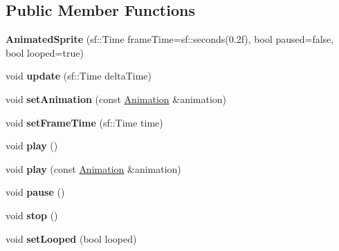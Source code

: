 \subsection*{Public Member Functions}
\begin{DoxyCompactItemize}
\item 
\mbox{\label{class_animated_sprite_a097ab8444824e7085d71a1f7144e7763}} 
{\bfseries Animated\+Sprite} (sf\+::\+Time frame\+Time=sf\+::seconds(0.\+2f), bool paused=false, bool looped=true)
\item 
\mbox{\label{class_animated_sprite_a17a41ff812631a9d8947d272933d6696}} 
void {\bfseries update} (sf\+::\+Time delta\+Time)
\item 
\mbox{\label{class_animated_sprite_ab1afc57d90d57a0c4bc4f5b090f2dacf}} 
void {\bfseries set\+Animation} (const \hyperlink{class_animation}{Animation} \&animation)
\item 
\mbox{\label{class_animated_sprite_af598fab5c3599ccc5ed1e2d4fefa68cc}} 
void {\bfseries set\+Frame\+Time} (sf\+::\+Time time)
\item 
\mbox{\label{class_animated_sprite_a203b968f1cb374cca5dbc89716174020}} 
void {\bfseries play} ()
\item 
\mbox{\label{class_animated_sprite_a9ea345649a4e012d096bc04aafe1ecb0}} 
void {\bfseries play} (const \hyperlink{class_animation}{Animation} \&animation)
\item 
\mbox{\label{class_animated_sprite_a48384db59427423b5c1d98f6ee94fe45}} 
void {\bfseries pause} ()
\item 
\mbox{\label{class_animated_sprite_af9734f4346d3d2370322b2dcaeef133c}} 
void {\bfseries stop} ()
\item 
\mbox{\label{class_animated_sprite_a855a5a48ea2e1c51c7c9304857dd2f8c}} 
void {\bfseries set\+Looped} (bool looped)
\item 
\mbox{\label{class_animated_sprite_a1a96a0f6570efddd2eb26f89bc5b6f50}} 

\end{DoxyCompactItemize}
